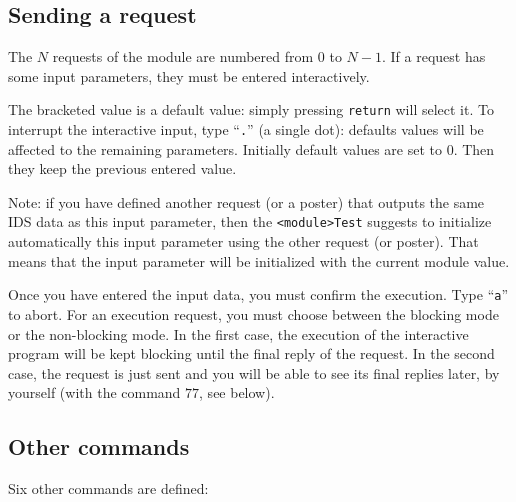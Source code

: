 \subsection{Sending a request}

The $N$ requests of the module are numbered from $0$ to $N-1$. If a
request has some input parameters, they must be entered interactively.

The bracketed value is a default value: simply pressing {\tt return} will
select  it.  To  interrupt the interactive  input,  type  ``{\tt .}''  (a
single   dot):   defaults  values  will   be  affected   to the remaining
parameters. Initially default values are set to $0$.  Then they keep the
previous entered value.

Note: if you have defined another request (or a poster) that outputs the
same IDS data as this input parameter, then the {\tt <module>Test}
suggests to initialize automatically this input parameter using the other
request (or poster). That means that the input parameter will be
initialized with the current module value.

Once    you  have  entered  the   input   data, you    must  confirm  the
execution. Type ``{\tt a}'' to abort.  For an execution request, you must
choose between  the blocking mode or the  non-blocking mode. In the first
case,  the execution  of  the interactive program  will be  kept blocking
until the final reply of the request.  In the second case, the request is
just sent and  you  will be  able to  see   its final replies   later, by
yourself (with the command $77$, see below).


\subsection{Other commands}

Six other commands are defined:

